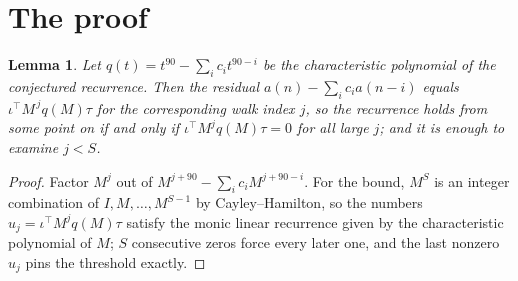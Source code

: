 \documentclass[11pt,a4paper]{article}
\theoremstyle{plain}
\newtheorem{lemma}[theorem]{Lemma}
\theoremstyle{definition}
\begin{document}
\section{The proof}

\begin{lemma}\label{lem:crit}
Let $q(t)=t^{90}-\sum_i c_it^{90-i}$ be the characteristic polynomial of the
conjectured recurrence. Then the residual $a(n)-\sum_ic_ia(n-i)$ equals
$\iota^{\!\top}M^{\,j}q(M)\tau$ for the corresponding walk index $j$, so the
recurrence holds from some point on if and only if $\iota^{\!\top}M^{j}q(M)\tau=0$ for all
large $j$; and it is enough to examine $j<S$.
\end{lemma}

\begin{proof}
Factor $M^{j}$ out of $M^{j+90}-\sum_ic_iM^{j+90-i}$. For the bound, $M^{S}$
is an integer combination of $I,M,\dots,M^{S-1}$ by Cayley--Hamilton, so the numbers
$u_j=\iota^{\!\top}M^{j}q(M)\tau$ satisfy the monic linear recurrence given by the
characteristic polynomial of $M$; $S$ consecutive zeros force every later one, and the last
nonzero $u_j$ pins the threshold exactly.
\end{proof}
\end{document}
